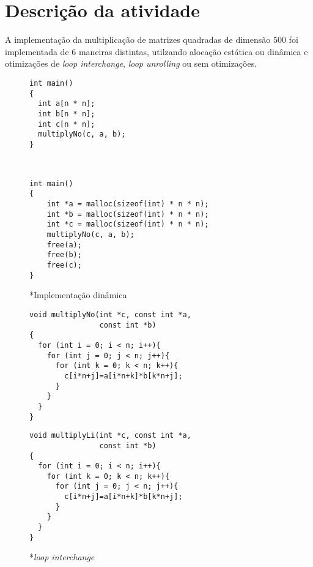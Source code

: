 \section{Descrição da atividade}

A implementação da multiplicação de matrizes quadradas de dimensão 500 foi implementada de 6 maneiras distintas, utilzando alocação estática ou dinâmica e otimizações de \textit{loop interchange}, \textit{loop unrolling} ou sem otimizações.



\begin{figure}[!h]
 \begin{minipage}{0.5\textwidth}
  \centering
  \begin{verbatim}
int main()
{
  int a[n * n];
  int b[n * n];
  int c[n * n];
  multiplyNo(c, a, b);
}



  \end{verbatim}
 \end{minipage}
 \begin{minipage}{0.5\textwidth}
  \centering
  \begin{verbatim}
int main()
{
    int *a = malloc(sizeof(int) * n * n);
    int *b = malloc(sizeof(int) * n * n);
    int *c = malloc(sizeof(int) * n * n);
    multiplyNo(c, a, b);
    free(a);
    free(b);
    free(c);
}
  \end{verbatim}
  *{\small Implementação dinâmica}
 \end{minipage}
  \label{lst:representation_examples}
\end{figure}


\begin{figure}[H]
 \begin{minipage}{0.5\textwidth}
  \centering
  \begin{verbatim}
void multiplyNo(int *c, const int *a, 
                const int *b)
{
  for (int i = 0; i < n; i++){
    for (int j = 0; j < n; j++){
      for (int k = 0; k < n; k++){
        c[i*n+j]=a[i*n+k]*b[k*n+j];
      }
    }
  }
}

  \end{verbatim}
 \end{minipage}
 \begin{minipage}{0.5\textwidth}
  \centering
  \begin{verbatim}
void multiplyLi(int *c, const int *a, 
                const int *b)
{
  for (int i = 0; i < n; i++){
    for (int k = 0; k < n; k++){
      for (int j = 0; j < n; j++){
        c[i*n+j]=a[i*n+k]*b[k*n+j];
      }
    }
  }
}

  \end{verbatim}
  *{\small \textit{loop interchange}}
 \end{minipage}
  \label{lst:representation_examples}
\end{figure}

